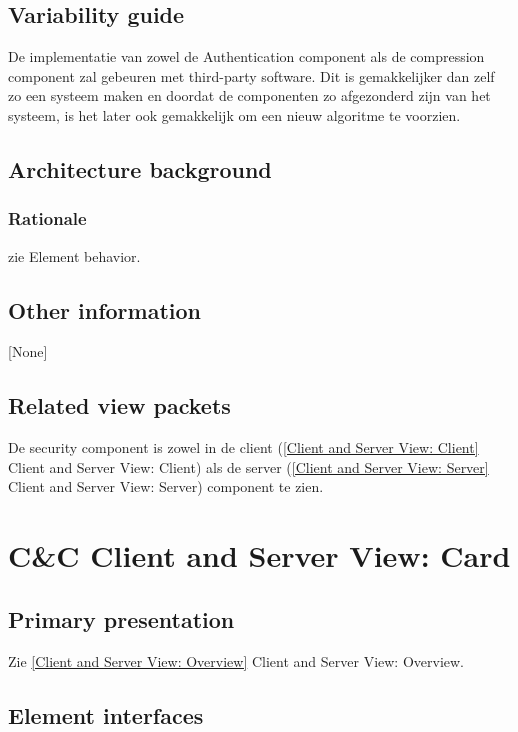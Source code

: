 \documentclass[a4paper,10pt]{article}
\begin{document}
\subsection{Variability guide}
De implementatie van zowel de Authentication component als de compression component zal gebeuren met third-party software. Dit is gemakkelijker dan zelf zo een systeem maken en doordat de componenten zo afgezonderd zijn van het systeem, is het later ook gemakkelijk om een nieuw algoritme te voorzien.\\

\subsection{Architecture background}

\subsubsection{Rationale}
zie Element behavior.


\subsection{Other information}
[None]

\subsection{Related view packets}
De security component is zowel in de client (\ref{Client and Server View: Client} Client and Server View: Client) als de server (\ref{Client and Server View: Server} Client and Server View: Server) component te zien.


\clearpage
\section{C\&C Client and Server View: Card}
\label{Client and Server View: Card}

\subsection{Primary presentation}
Zie \ref{Client and Server View: Overview} Client and Server View: Overview.

\subsection{Element interfaces}
\end{document}

